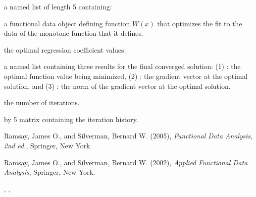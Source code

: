 \documentclass{article}
\begin{document}
\begin{Value}
a named list of length 5 containing:

\begin{ldescription}
\item[\code{Wfdobj}] a functional data object defining function $W(x)$ that optimizes the fit
to the data of the monotone function that it defines. 

\item[\code{beta}] the optimal regression coefficient values.

\item[\code{Flist}] a named list containing three results for the final converged solution:
(1)
: the optimal function value being minimized,
(2)
: the gradient vector at the optimal solution,   and
(3)
: the norm of the gradient vector at the optimal solution.

\item[\code{iternum}] the number of iterations.

\item[\code{iterhist}]  by 5 matrix containing the iteration
history.

\end{ldescription}
\end{Value}
\begin{References}\relax
Ramsay, James O., and Silverman, Bernard W. (2005), \emph{Functional 
Data Analysis, 2nd ed.}, Springer, New York. 

Ramsay, James O., and Silverman, Bernard W. (2002), \emph{Applied
Functional Data Analysis}, Springer, New York.
\end{References}
\begin{SeeAlso}\relax
{}, 
, 
\end{SeeAlso}
\end{document}
